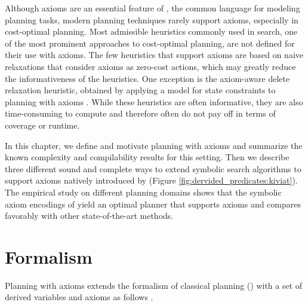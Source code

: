 Although axioms are an essential feature \autocite{thiebaux-et-al-aij2005} of \pddl{} \autocite{mcdermott-et-al-tr1998,hoffmann-edelkamp-jair2005}, the common language for modeling planning tasks, modern planning techniques rarely support axioms, especially in cost-optimal planning.
Most admissible heuristics commonly used in \astar{} search, one of the most prominent approaches to cost-optimal planning, are not defined for their use with axioms.
The few heuristics that support axioms are based on naive relaxations that consider axioms as zero-cost actions, which may greatly reduce the informativeness of the heuristics.
One exception is the axiom-aware delete relaxation heuristic, obtained by applying a model for state constraints to planning with axioms \autocite{ivankovic-haslum-ijcai2015,haslum-et-al-jair2018}.
While these heuristics are often informative, they are also time-consuming to compute and therefore often do not pay off in terms of coverage or runtime. 

In this chapter, we define and motivate planning with axioms and summarize the known complexity and compilability results for this setting.
Then we describe three different sound and complete ways to extend symbolic search algorithms to support axioms natively introduced by \textcite{speck-et-al-icaps2019} (Figure \ref{fig:dervided_predicates:kiviat}).
The empirical study on different planning domains shows that the symbolic axiom encodings of \textcite{speck-et-al-icaps2019} yield an optimal planner that supports axioms and compares favorably with other state-of-the-art methods.

\section{Formalism}
Planning with axioms extends the formalism of classical planning () with a set of derived variables and axioms as follows \autocite{thiebaux-et-al-aij2005,helmert-2008}.

